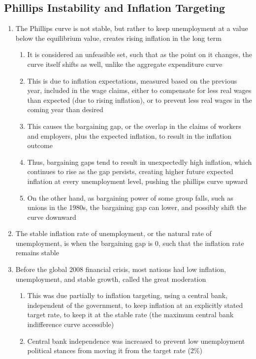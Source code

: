 \subsection{Phillips Instability and Inflation Targeting}
\begin{enumerate}
\item The Phillips curve is not stable, but rather to keep unemployment at a value below the equilibrium value, creates rising inflation in the long term
\begin{enumerate}
\item It is considered an unfeasible set, such that as the point on it changes, the curve itself shifts as well, unlike the aggregate expenditure curve
\item This is due to inflation expectations, measured based on the previous year, included in the wage claims, either to compensate for less real wages than expected (due to rising inflation), or to prevent less real wages in the coming year than desired
\item This causes the bargaining gap, or the overlap in the claims of workers and employers, plus the expected inflation, to result in the inflation outcome
\item Thus, bargaining gaps tend to result in unexpectedly high inflation, which continues to rise as the gap persists, creating higher future expected inflation at every unemployment level, pushing the phillips curve upward
\item On the other hand, as bargaining power of some group falls, such as unions in the 1980s, the bargaining gap can lower, and possibly shift the curve downward
\end{enumerate}
\item The stable inflation rate of unemployment, or the natural rate of unemployment, is when the bargaining gap is 0, such that the inflation rate remains stable
\item Before the global 2008 financial crisis, most nations had low inflation, unemployment, and stable growth, called the great moderation
\begin{enumerate}
\item This was due partially to inflation targeting, using a central bank, independent of the government, to keep inflation at an explicitly stated target rate, to keep it at the stable rate (the maximum central bank indifference curve accessible)
\item Central bank independence was increased to prevent low unemployment political stances from moving it from the target rate (2\%)

\end{enumerate}
\end{enumerate}
